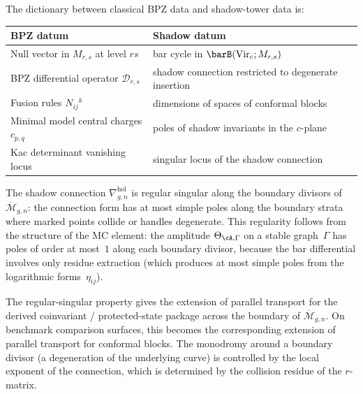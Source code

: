 \begin{remark}
\label{rem:thqg-intro-bpz-shadow-dictionary}
The dictionary between classical BPZ data and shadow-tower data is:
\begin{center}
\small
\begin{tabular}{ll}
\textbf{BPZ datum} & \textbf{Shadow datum} \\ \hline
Null vector in $M_{r,s}$ at level $rs$
 & bar cycle in $\barB(\mathrm{Vir}_c; M_{r,s})$ \\[2pt]
BPZ differential operator $\mathcal{D}_{r,s}$
 & shadow connection restricted to degenerate insertion \\[2pt]
Fusion rules $N_{ij}{}^k$
 & dimensions of spaces of conformal blocks \\[2pt]
Minimal model central charges $c_{p,q}$
 & poles of shadow invariants in the $c$-plane \\[2pt]
Kac determinant vanishing locus
 & singular locus of the shadow connection
\end{tabular}
\end{center}
\end{remark}

\begin{remark}
\label{rem:thqg-intro-shadow-regularity}
The shadow connection $\nabla^{\mathrm{hol}}_{g,n}$ is regular singular
along the boundary divisors of $\overline{\mathcal{M}}_{g,n}$: the
connection form has at most simple poles along the boundary strata
where marked points collide or handles degenerate. This regularity
follows from the structure of the MC element: the amplitude
$\Theta_{\cA,\Gamma}$ on a stable graph~$\Gamma$ has poles of order
at most~$1$ along each boundary divisor, because the bar differential
involves only residue extraction (which produces at most simple poles
from the logarithmic forms~$\eta_{ij}$).

The regular-singular property gives the extension of parallel
transport for the derived coinvariant / protected-state package across
the boundary of $\overline{\mathcal{M}}_{g,n}$. On benchmark
comparison surfaces, this becomes the corresponding extension of
parallel transport for conformal blocks. The monodromy around a boundary
divisor (a degeneration of the underlying curve) is controlled by the
local exponent of the connection, which is determined by the
collision residue of the $r$-matrix.
\end{remark}

